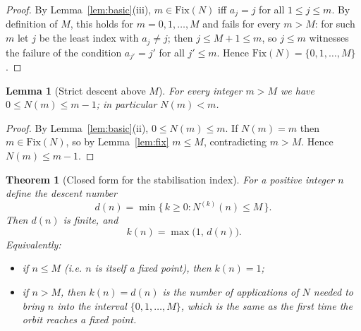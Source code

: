 \documentclass[12pt]{article}
\newtheorem{theorem}{Theorem}
\newtheorem{lemma}{Lemma}
\theoremstyle{definition}
\begin{document}
\begin{proof}
By Lemma~\ref{lem:basic}(iii), $m\in\mathrm{Fix}(N)$ iff $a_j=j$ for all
$1\le j\le m$. By definition of $M$, this holds for $m=0,1,\dots,M$ and fails for
every $m>M$: for such $m$ let $j$ be the least index with $a_j\ne j$; then $j\le M+1\le m$,
so $j\le m$ witnesses the failure of the condition $a_{j'}=j'$ for all $j'\le m$.
Hence $\mathrm{Fix}(N)=\{0,1,\dots,M\}$.
\end{proof}

\begin{lemma}[Strict descent above $M$]\label{lem:descent}
For every integer $m>M$ we have $0\le N(m)\le m-1$; in particular $N(m)<m$.
\end{lemma}

\begin{proof}
By Lemma~\ref{lem:basic}(ii), $0\le N(m)\le m$. If $N(m)=m$ then $m\in\mathrm{Fix}(N)$,
so by Lemma~\ref{lem:fix} $m\le M$, contradicting $m>M$. Hence $N(m)\le m-1$.
\end{proof}

\begin{theorem}[Closed form for the stabilisation index]\label{thm:k}
For a positive integer $n$ define the \emph{descent number}
\[
  d(n)=\min\{\,k\ge 0: N^{(k)}(n)\le M\,\}.
\]
Then $d(n)$ is finite, and
\[
  \boxed{\,k(n)=\max\bigl(1,\,d(n)\bigr).}
\]
Equivalently:
\begin{itemize}
\item if $n\le M$ (i.e. $n$ is itself a fixed point), then $k(n)=1$;
\item if $n>M$, then $k(n)=d(n)$ is the number of applications of $N$ needed to bring
$n$ into the interval $\{0,1,\dots,M\}$, which is the same as the first time the orbit
reaches a fixed point.
\end{itemize}
\end{theorem}
\end{document}

